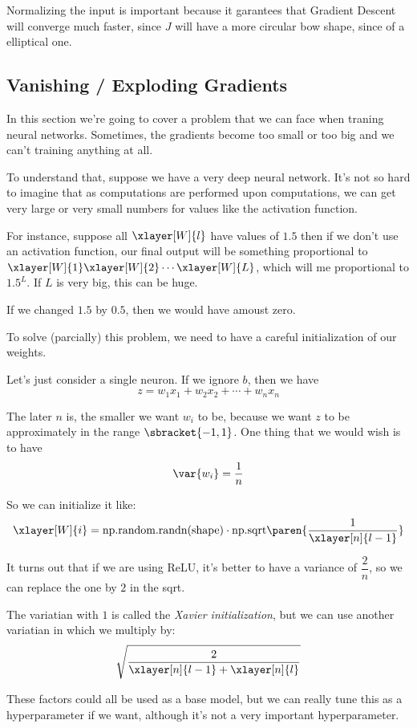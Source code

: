 \documentclass[12pt, a4paper, oneside]{book}
\begin{document}
Normalizing the input is important because it garantees that Gradient Descent
will converge much faster, since $J$ will have a more circular bow shape, since
of a elliptical one.

\subsection{Vanishing / Exploding Gradients}%
\label{sub:vanishing_exploding_gradients}

In this section we're going to cover a problem that we can face when traning
neural networks. Sometimes, the gradients become too small or too big and we
can't training anything at all.

To understand that, suppose we have a very deep neural network. It's not so hard
to imagine that as computations are performed upon computations, we can get very
large or very small numbers for values like the activation function.

For instance, suppose all $\xlayer[W]{l}$ have values of $1.5$ then if we don't
use an activation function, our final output will be something proportional to
$\xlayer[W]{1}\xlayer[W]{2}\cdots\xlayer[W]{L}$, which will me proportional to
$1.5^{L}$. If $L$ is very big, this can be huge.

If we changed $1.5$ by $0.5$, then we would have amoust zero.

To solve (parcially) this problem, we need to have a careful initialization of
our weights.

Let's just consider a single neuron. If we ignore $b$, then we have
\[
z = w_1x_1+w_2x_2+\cdots+w_nx_n
\]

The later $n$ is, the smaller we want $w_i$ to be, because we want $z$ to be
approximately in the range $\sbracket{-1,1}$. One thing that we would wish is to
have
\[
    \var{w_i}=\dfrac{1}{n}
\]

So we can initialize it like:
\[
    \xlayer[W]{i}=\text{np.random.randn(shape)}\cdot\text{np.sqrt}\paren{\dfrac{1}{\xlayer[n]{l-1}}}
\]

It turns out that if we are using ReLU, it's better to have a variance of
$\dfrac{2}{n}$, so we can replace the one by $2$ in the sqrt.

The variatian with $1$ is called the \textit{Xavier initialization}, but we can
use another variatian in which we multiply by:
\[
\sqrt{\dfrac{2}{\xlayer[n]{l-1}+\xlayer[n]{l}}}
\]

These factors could all be used as a base model, but we can really tune this as
a hyperparameter if we want, although it's not a very important hyperparameter.
\end{document}
